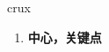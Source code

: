 
\begin{frame}
{\huge crux}
\begin{center}
\begin{enumerate}\Large
  \item \textbf{中心，关键点}
\end{enumerate}
\end{center}
\end{frame}
